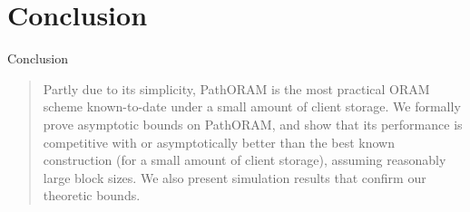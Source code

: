 
\section{Conclusion}

	\begin{frame}{Conclusion}

		\begin{quote}

			Partly due to its simplicity, PathORAM is the most practical ORAM scheme known-to-date under a small amount of client storage.
			We formally prove asymptotic bounds on PathORAM, and show that its performance is competitive with or asymptotically better than the best known construction (for a small amount of client storage), assuming reasonably large block sizes. 
			We also present simulation results that confirm our theoretic bounds.~\cite{Stefanov:2013:POE:2508859.2516660}

		\end{quote}


	\end{frame}
